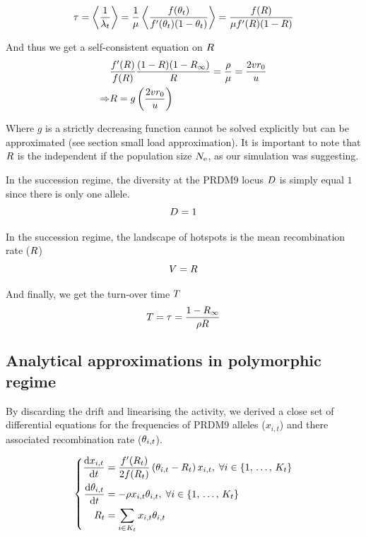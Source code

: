 \documentclass{article}
\begin{document}
\begin{equation}
\tau = \left< \dfrac{1}{\lambda_t} \right> = \dfrac{1}{ \mu }\left< \dfrac{f(\theta_{t} )}{f'(\theta_{t})(1 - \theta_{t} )} \right>  = \dfrac{f(R )}{ \mu f'(R)(1 - R) }
\end{equation}

And thus we get a self-consistent equation on $R$ 
\begin{align} 
	& \dfrac{f'(R )}{f(R )} \dfrac{(1- R )(1- {R_{\infty}} )}{R } = \dfrac{\rho }{ \mu} = \dfrac{2 v r_0}{u} \\
	\Rightarrow  & R= g\left(\dfrac{2 v r_0}{ u}\right)
\end{align}

Where $g$ is a strictly decreasing function cannot be solved explicitly but can be approximated (see section small load approximation). 
It is important to note that $R$ is the independent if the population size $N_\mathrm{e}$, as our simulation was suggesting.

In the succession regime, the diversity at the PRDM9 locus $D$ is simply equal $1$ since there is only one allele.
\begin{equation}
  D = 1
\end{equation}

In the succession regime, the landscape of hotspots is the mean recombination rate ($R$)
\begin{equation}
  V = R
\end{equation}

And finally, we get the turn-over time $T$ 
\begin{equation}
  T =  \tau = \dfrac{1 - {R_{\infty}} }{\rho R }
\end{equation}

\subsection*{Analytical approximations in polymorphic regime}

By discarding the drift and linearising the activity, we derived a close set of differential equations for the frequencies of PRDM9 alleles ($x_{i,t}$) and there associated recombination rate ($\theta_{i,t}$). 

\begin{equation}
\left\{
      \begin{aligned}
          \dfrac{\mathrm{d} x_{i,t}}{\mathrm{d} t} &= \dfrac{f'(R_{t} )}{2 f(R_{t} )} \left( \theta_{i,t}  - R_{t}  \right) x_{i,t}, \;
             \forall i \in \{ 1, \, \dots, \, K_{t} \} \\
        \dfrac{\mathrm{d} \theta_{i,t}}{\mathrm{d} t} &= 
        - \rho x_{i,t} \theta_{i,t}, \;
             \forall i \in \{ 1, \, \dots, \, K_{t} \} \\
             R_{t} &= \sum_{i \in K_{t}} x_{i,t} \theta _{i,t} 
      \end{aligned}
\right. 
\end{equation}
\end{document}
